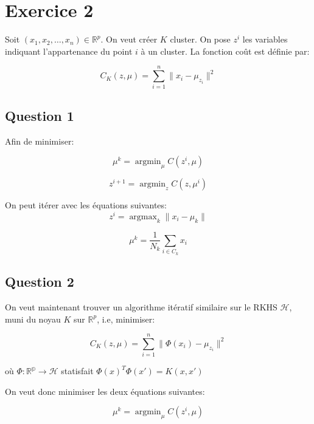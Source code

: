 \documentclass{article}
\DeclareMathOperator{\argmax}{argmax}
\DeclareMathOperator{\argmin}{argmin}
\begin{document}
\section{Exercice 2}

Soit $(x_1, x_2, \dots, x_n) \in \mathbb{R}^p$. On veut créer $K$ cluster. On
pose $z^i$ les variables indiquant l'appartenance du point $i$ à un cluster.
La fonction coût est définie par:

\begin{equation*}
C_K(z, \mu) = \sum_{i = 1}^n \| x_i - \mu_{z_i}\|^2
\end{equation*}


\subsection{Question 1}

Afin de minimiser:

\begin{equation*}
\mu^k = \argmin_{\mu} C(z^i, \mu)
\end{equation*}

\begin{equation*}
z^{i + 1} = \argmin_z C(z, \mu^i)
\end{equation*}

On peut itérer avec les équations suivantes:
\begin{equation*}
z^i = \argmax_k \| x_i - \mu_k\|
\end{equation*}

\begin{equation*}
\mu^k = \frac{1}{N_k} \sum_{i \in C_k}x_i
\end{equation*}

\subsection{Question 2}
On veut maintenant trouver un algorithme itératif similaire sur le RKHS
$\mathcal{H}$, muni du noyau $K$ sur $\mathbb{R}^p$, i.e, minimiser:

\begin{equation*}
C_K(z, \mu) = \sum_{i = 1}^n \| \Phi(x_i) - \mu_{z_i}\|^2
\end{equation*}

où $\Phi : \mathbb{R^p} \rightarrow \mathcal{H}$ statisfait $\Phi(x)^T \Phi(x')
= K(x, x')$

On veut donc minimiser les deux équations suivantes:

\begin{equation*}
\mu^k = \argmin_{\mu} C(z^i, \mu)
\end{equation*}
\end{document}
